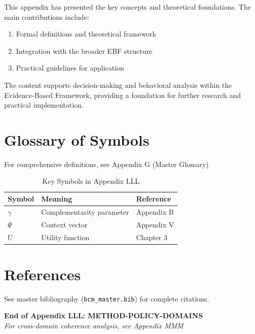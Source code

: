 This appendix has presented the key concepts and theoretical foundations.
The main contributions include:

\begin{enumerate}
    \item Formal definitions and theoretical framework
    \item Integration with the broader EBF structure
    \item Practical guidelines for application
\end{enumerate}

The content supports decision-making and behavioral analysis within the
Evidence-Based Framework, providing a foundation for further research
and practical implementation.


\section{Glossary of Symbols}
\label{sec:lll-glossary}

For comprehensive definitions, see Appendix G (Master Glossary).

\begin{table}[htbp]
\centering
\caption{Key Symbols in Appendix LLL}
\begin{tabular}{lll}
\toprule
\textbf{Symbol} & \textbf{Meaning} & \textbf{Reference} \\
\midrule
$\gamma$ & Complementarity parameter & Appendix B \\
$\Psi$ & Context vector & Appendix V \\
$U$ & Utility function & Chapter 3 \\
\bottomrule
\end{tabular}
\end{table}


\section{References}
\label{sec:references}

See master bibliography (\texttt{bcm\_master.bib}) for complete citations.

\nocite{bcm_master}


\vspace{2cm}
\begin{center}
{\large \textbf{End of Appendix LLL: METHOD-POLICY-DOMAINS}} \\
\vspace{0.5cm}
{\small \textit{For cross-domain coherence analysis, see Appendix MMM}}
\end{center}
